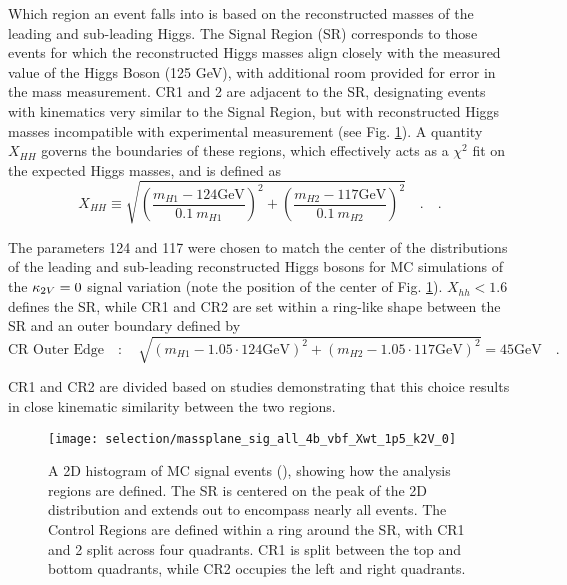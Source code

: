         Which region an event falls into is based on the reconstructed masses of the leading and sub-leading Higgs.
        The Signal Region (SR) corresponds to those events for which the reconstructed Higgs masses
            align closely with the measured value of the Higgs Boson (125 GeV),
            with additional room provided for error in the mass measurement.
        CR1 and 2 are adjacent to the SR, designating events with kinematics very similar to the Signal Region,
            but with reconstructed Higgs masses incompatible with experimental measurement (see Fig. \ref{fig:region_definition}).
        A quantity $X_{HH}$ governs the boundaries of these regions,
            which effectively acts as a $\chi^2$ fit on the expected Higgs masses,
            and is defined as
        \begin{equation} \label{eq:xhh}
            X_{HH} \equiv \sqrt{\left(\frac{m_{H1} - 124\textrm{GeV}}{0.1 \ m_{H1}}\right)^{2}
                + \left(\frac{m_{H2} - 117\textrm{GeV}}{0.1 \ m_{H2}}\right)^{2}} \quad.
            \quad.
        \end{equation}

        The \mhh parameters 124 and 117 were chosen to match the center of the \mhh distributions
            of the leading and sub-leading reconstructed Higgs bosons for
            MC simulations of the $\kappa_{2V} = 0$ signal variation
            (note the position of the center of Fig. \ref{fig:region_definition}).
        $X_{hh} < 1.6$ defines the SR,
            while CR1 and CR2 are set within a ring-like shape between the SR
            and an outer boundary defined by
        \begin{equation} \label{eq:cr_out}
            \text{CR\ Outer\ Edge} \quad : \quad \sqrt{ \left(m_{H1} - 1.05 \cdot 124\textrm{GeV}\right)^2
                +  \left(m_{H2} - 1.05 \cdot 117\textrm{GeV}\right)^2 } = 45\textrm{GeV}
            \quad.
        \end{equation}
        
        CR1 and CR2 are divided based on studies demonstrating that this choice results in
            close kinematic similarity between the two regions.

        \begin{figure}[tbh]
            \texttt{[image: selection/massplane\_sig\_all\_4b\_vbf\_Xwt\_1p5\_k2V\_0]}
            \caption{
                A 2D histogram of MC signal events (), showing how the analysis regions are defined.
                The SR is centered on the peak of the 2D distribution and extends out to encompass nearly all events.
                The Control Regions are defined within a ring around the SR,
                    with CR1 and 2 split across four quadrants.
                CR1 is split between the top and bottom quadrants,
                    while CR2 occupies the left and right quadrants.
                \cite{hh4b_2021_int_note}
            }
            \label{fig:region_definition}
        \end{figure}

